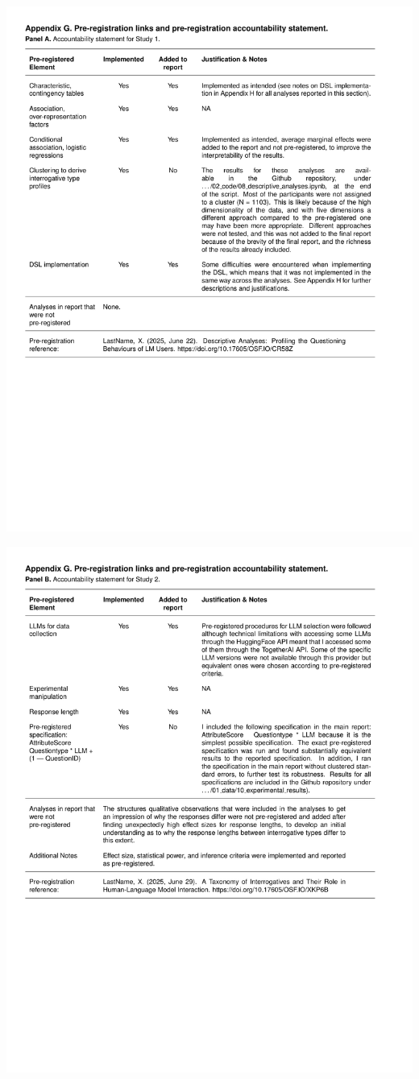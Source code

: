 \documentclass[
  12pt,
]{article}
\begin{document}
\includegraphics{../03_outputs/04_appendices/appendix_g_i.pdf}

\includegraphics{../03_outputs/04_appendices/appendix_g_ii.pdf}
\end{document}
